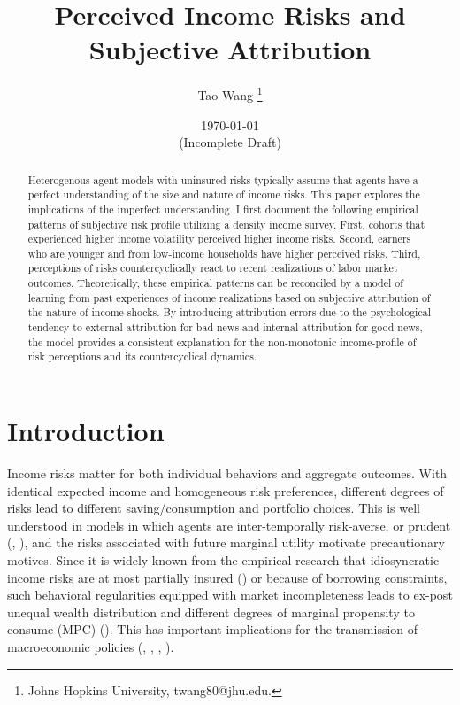 \documentclass[12pt,notitlepage,onecolumn,aps,pra]{article}
\begin{document}
    
    \title{Perceived Income Risks and Subjective Attribution}\author{Tao Wang \thanks{Johns Hopkins University, twang80@jhu.edu.}}

\date{\today \\(Incomplete Draft)}
\maketitle\begin{abstract}Heterogenous-agent models with uninsured risks typically assume that agents have a perfect understanding of the size and nature of income risks. This paper explores the implications of the imperfect understanding. I first document the following empirical patterns of subjective risk profile utilizing a density income survey. First, cohorts that experienced higher income volatility perceived higher income risks. Second, earners who are younger and from low-income households have higher perceived risks. Third, perceptions of risks countercyclically react to recent realizations of labor market outcomes. Theoretically, these empirical patterns can be reconciled by a model of learning from past experiences of income realizations based on subjective attribution of the nature of income shocks. By introducing attribution errors due to the psychological tendency to external attribution for bad news and internal attribution for good news, the model provides a consistent explanation for the non-monotonic income-profile of risk perceptions and its countercyclical dynamics.\end{abstract}


    
    

    
    \hypertarget{introduction}{%
\section{Introduction}\label{introduction}}

Income risks matter for both individual behaviors and aggregate
outcomes. With identical expected income and homogeneous risk
preferences, different degrees of risks lead to different
saving/consumption and portfolio choices. This is well understood in
models in which agents are inter-temporally risk-averse, or prudent
(\cite{kimball1990precautionary}, \cite{carroll2001liquidity}), and the
risks associated with future marginal utility motivate precautionary
motives. Since it is widely known from the empirical research that
idiosyncratic income risks are at most partially insured
(\cite{blundell_consumption_2008}) or because of borrowing constraints,
such behavioral regularities equipped with market incompleteness leads
to ex-post unequal wealth distribution and different degrees of marginal
propensity to consume (MPC) (\cite{aiyagari1994uninsured}). This has
important implications for the transmission of macroeconomic policies
(\cite{krueger2016macroeconomics}, \cite{kaplan2018monetary},
\cite{auclert2019monetary}, \cite{bayer2019precautionary}).
\end{document}
